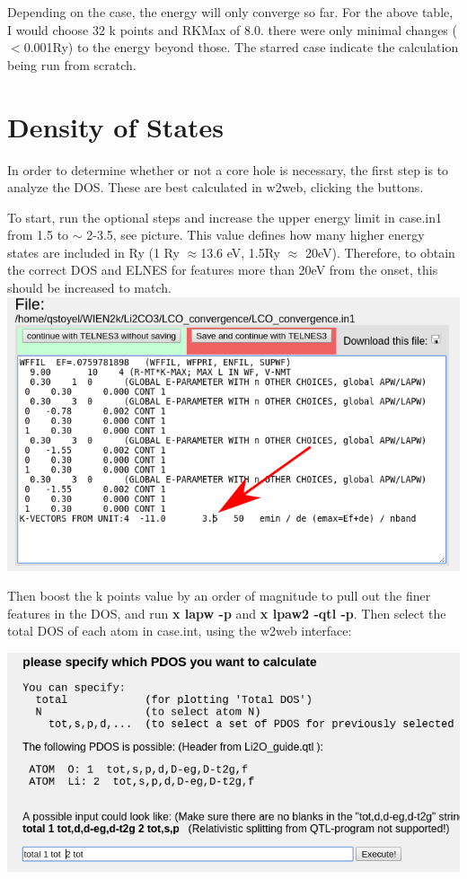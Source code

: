 \documentclass[12pt]{article}
\begin{document}
Depending on the case, the energy will only converge so far.  For the above table, I would choose 32 k points and RKMax of 8.0.  there were only minimal changes ($<$0.001Ry) to the energy beyond those. The starred case indicate the calculation being run from scratch.  


\section{Density of States}
In order to determine whether or not a core hole is necessary, the first step is to analyze the DOS.  These are best calculated in w2web, clicking the buttons.

To start, run the optional steps and increase the upper energy limit in case.in1 from 1.5 to $\sim$ 2-3.5, see picture.  This value defines how many higher energy states are included in Ry (1 Ry $\approx$13.6 eV, 1.5Ry $\approx$ 20eV). Therefore, to obtain the correct DOS and ELNES for features more than 20eV from the onset,  this should be increased to match.  \\

\includegraphics[scale=0.4]{./images/in1_edit.png}

Then boost the k points value by an order of magnitude to pull out the finer features in the DOS, and run \textbf{x lapw -p} and \textbf{x lpaw2 -qtl -p}.   Then select the total DOS of each atom  in case.int, using the w2web interface:

\includegraphics[scale=0.4]{./images/tetra_states.png}
\end{document}
